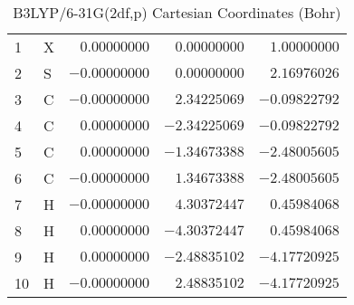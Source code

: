 \documentclass[10pt,oneside]{article}
\begin{document}
\begin{table}[h]
\centering
\caption{B3LYP/6-31G(2df,p) Cartesian Coordinates (Bohr)}
\begin{tabular}{llrrr}
\toprule
1  & X  & $ 0.00000000$ & $ 0.00000000$ & $ 1.00000000$ \\
2  & S  & $-0.00000000$ & $ 0.00000000$ & $ 2.16976026$ \\
3  & C  & $-0.00000000$ & $ 2.34225069$ & $-0.09822792$ \\
4  & C  & $ 0.00000000$ & $-2.34225069$ & $-0.09822792$ \\
5  & C  & $ 0.00000000$ & $-1.34673388$ & $-2.48005605$ \\
6  & C  & $-0.00000000$ & $ 1.34673388$ & $-2.48005605$ \\
7  & H  & $-0.00000000$ & $ 4.30372447$ & $ 0.45984068$ \\
8  & H  & $ 0.00000000$ & $-4.30372447$ & $ 0.45984068$ \\
9  & H  & $ 0.00000000$ & $-2.48835102$ & $-4.17720925$ \\
10 & H  & $-0.00000000$ & $ 2.48835102$ & $-4.17720925$ \\
\bottomrule
\end{tabular}
\end{table}
\end{document}
